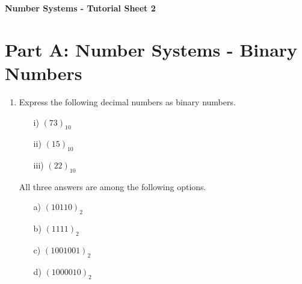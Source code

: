 \documentclass[11pt,a4paper,titlepage,oneside,openany]{article}
\numberwithin{equation}{section}
\numberwithin{algorithm}{section}
\numberwithin{figure}{section}
\numberwithin{table}{section}
\begin{document}
\Large
\begin{center}
  \textbf{Number Systems - Tutorial Sheet 2}
\end{center}
\section*{Part A: Number Systems - Binary Numbers}
\begin{enumerate}
\item Express the following decimal numbers as binary numbers.
  \begin{multicols}{4}
    \begin{itemize}
    \item[i)] $(73)_{10}$
    \item[ii)] $(15)_{10}$
    \item[iii)] $(22)_{10}$
    \end{itemize}
  \end{multicols}

  All three answers are among the following options.
  \begin{multicols}{4}
    \begin{itemize}
    \item[a)] $(10110)_{2}$ %
    \item[b)] $(1111)_{2}$ %
    \item[c)] $(1001001)_{2}$ %
    \item[d)] $(1000010)_{2}$ %
    \end{itemize}
  \end{multicols}


\end{enumerate}
\end{document}
